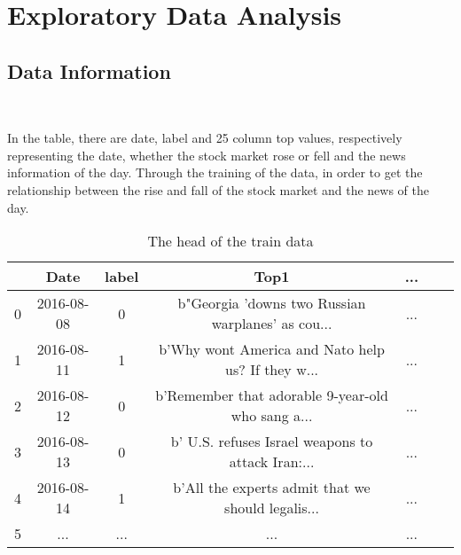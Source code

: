 \section{Exploratory Data Analysis} \label{sec-data_exploration}

\subsection{Data Information}
\

In the table, there are date, label and 25 column top values, 
respectively representing the date, 
whether the stock market rose or fell and 
the news information of the day.
Through the training of the data, 
in order to get the relationship between 
the rise and fall of the stock market and the news of the day.

\begin{table}[htbp]  \centering
	\caption{The head of the train data}
	\label{tbl:data information}
	\begin{tabular}{ccccccc}
		\hline
    & Date & label & Top1 & ...\\
    \hline
    0 & 2016-08-08    & 0     & b"Georgia 'downs two Russian warplanes' as cou... & ...\\
    1 & 2016-08-11    & 1     & b'Why wont America and Nato help us? If they w... & ...\\
    2 & 2016-08-12    & 0     & b'Remember that adorable 9-year-old who sang a... & ...\\
    3 & 2016-08-13    & 0     & b' U.S. refuses Israel weapons to attack Iran:... & ...\\
    4 & 2016-08-14    & 1     & b'All the experts admit that we should legalis... & ...\\
    5 & ...           & ...   & ...                                               & ...\\
        \hline 
	\end{tabular}
\end{table}


